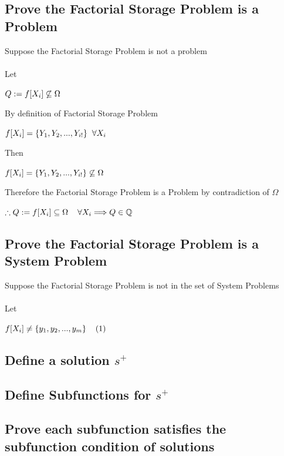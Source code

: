 \documentclass[11pt]{article}
\begin{document}
\subsection{Prove the Factorial Storage Problem is a Problem}
Suppose the Factorial Storage Problem is not a problem\\ \\
Let
\begin{center}
$
Q := f[X_i] \not \subseteq \Omega \hspace{2mm}
$
\end{center}
By definition of Factorial Storage Problem
\begin{center}
$
f[X_i] = \{Y_1,Y_2,...,Y_{i!}\} \hspace{2mm} \forall X_i
$
\end{center}
Then
\begin{center}
$
f[X_i] = \{Y_1,Y_2,...,Y_{i!}\} \not \subseteq \Omega \hspace{2mm}
$
\end{center}
Therefore the Factorial Storage Problem is a Problem by contradiction of $\Omega$
\begin{center}
$
\therefore Q := f[X_i] \subseteq \Omega \hspace{4mm} \forall X_i \Longrightarrow Q \in \mathbb{Q}
$
\end{center}
\subsection{Prove the Factorial Storage Problem is a System Problem}
Suppose the Factorial Storage Problem is not in the set of System Problems\\ \\
Let
\begin{center}
$
f[X_i] \neq \{y_1,y_2,...,y_m\} \hspace{4mm} (1)
$
\end{center}
\subsection{Define a solution $s^+$}
\subsection{Define Subfunctions for $s^+$}
\subsection{Prove each subfunction satisfies the subfunction condition of solutions}
\end{document}
